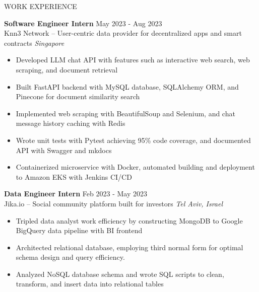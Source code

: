 \documentclass{resume} %
\begin{document}
\begin{rSection}{WORK EXPERIENCE}

	\textbf{Software Engineer Intern} \hfill May 2023 - Aug 2023\\
	Knn3 Network – User-centric data provider for decentralized apps and smart contracts  \hfill \textit{Singapore}
	\begin{itemize}
		\item Developed LLM chat API with features such as interactive web search, web scraping, and document retrieval
		\item Built FastAPI backend with MySQL database, SQLAlchemy ORM, and Pinecone for document similarity search
		\item Implemented web scraping with BeautifulSoup and Selenium, and chat message history caching with Redis
		\item Wrote unit tests with Pytest achieving 95\% code coverage, and documented API with Swagger and mkdocs
		\item Containerized microservice with Docker, automated building and deployment to Amazon EKS with Jenkins CI/CD
	\end{itemize}

	\textbf{Data Engineer Intern} \hfill Feb 2023 - May 2023\\
	Jika.io – Social community platform built for investors \hfill \textit{Tel Aviv, Israel}
	\begin{itemize}
		\item Tripled data analyst work efficiency by constructing MongoDB to Google BigQuery data pipeline with BI frontend
		\item Architected relational database, employing third normal form for optimal schema design and query efficiency.
		\item Analyzed NoSQL database schema and wrote SQL scripts to clean, transform, and insert data into relational tables
	\end{itemize}

\end{rSection}

\end{document}
